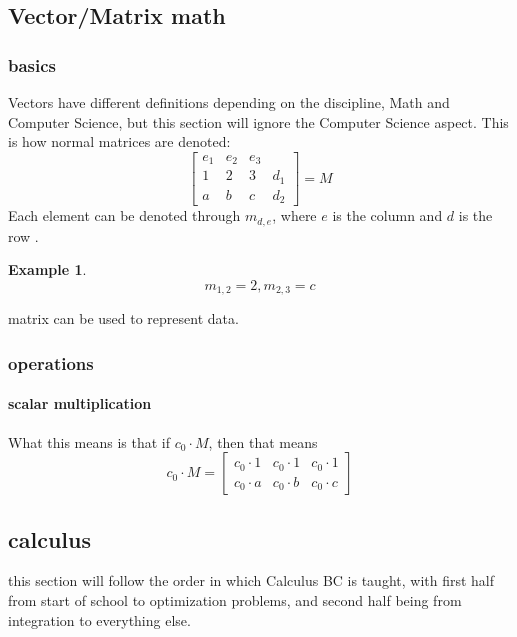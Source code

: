 \documentclass{article} %
\theoremstyle{theorem}
\newtheorem{exmat}{Example}[subsection]
\theoremstyle{definition}
\begin{document}
    \subsection{Vector/Matrix math} %
    \label{sub:vecMat}
        \subsubsection{basics}
            Vectors have different definitions depending on the discipline, Math and Computer Science, but this section will ignore the Computer Science aspect.
            This is how normal matrices are denoted:
            \[\begin{bmatrix}
                e_1 & e_2 & e_3 & \\
                1 & 2 & 3 & d_1\\
                a & b & c & d_2
            \end{bmatrix}=M\]
            Each element can be denoted through $m_{d,e}$, where $e$ is the column and $d$ is the row .
            \begin{exmat}
                \[
                    m_{1,2}=2, m_{2,3}=c
                \]
            \end{exmat}
            matrix can be used to represent data.
        \subsubsection{operations} %
        \label{ssub:operations}
            \paragraph{scalar multiplication}
                What this means is that if $c_0\cdot M$, then that means 
                \[ c_0\cdot M = \begin{bmatrix}
                    c_0\cdot 1 &c_0\cdot 1 &c_0\cdot 1 \\
                    c_0\cdot a & c_0\cdot b &c_0\cdot c
                \end{bmatrix} \]
        
    \pagebreak
    \subsection{calculus}
    this section will follow the order in which Calculus BC is taught, with first half from start of school to optimization problems, and second half being from integration to everything else.
\end{document}
